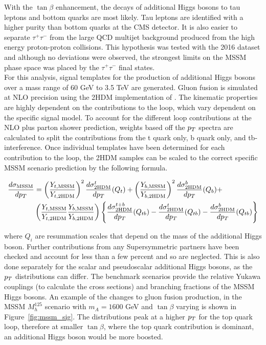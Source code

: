With the $\tan\beta$ enhancement, the decays of additional Higgs bosons to tau leptons and bottom quarks are most likely.
Tau leptons are identified with a higher purity than bottom quarks at the CMS detector.
It is also easier to separate $\tau^{+}\tau^{-}$ from the large QCD multijet background produced from the high energy proton-proton collisions.
This hypothesis was tested with the 2016 dataset and although no deviations were observed, the strongest limits on the MSSM phase space was placed by the $\tau^+\tau^-$ final states. \\

For this analysis, signal templates for the production of additional Higgs bosons over a mass range of 60 GeV to 3.5 TeV are generated.
Gluon fusion is simulated at NLO precision using the 2HDM implementation of .
The kinematic properties are highly dependent on the contributions to the loop, which vary dependent on the specific signal model.
To account for the different loop contributions at the NLO plus parton shower prediction, weights based off the $p_{T}$ spectra are calculated to split the contributions from the t quark only, b quark only, and tb-interference.
Once individual templates have been determined for each contribution to the loop, the 2HDM samples can be scaled to the correct specific MSSM scenario prediction by the following formula.

\begin{align}
\frac{d\sigma_{\text{MSSM}}}{dp_{T}} & = \left(\frac{Y_{t,\text{MSSM}}}{Y_{t,\text{2HDM}}}\right)^{2}\frac{d\sigma^{t}_{\text{2HDM}}}{dp_{T}}(Q_{t}) + \left(\frac{Y_{b,\text{MSSM}}}{Y_{b,\text{2HDM}}}\right)^{2}\frac{d\sigma^{b}_{\text{2HDM}}}{dp_{T}}(Q_{b}) + \nonumber \\
& \left(\frac{Y_{t,\text{MSSM}}}{Y_{t,\text{2HDM}}}\frac{Y_{b,\text{MSSM}}}{Y_{b,\text{2HDM}}}\right) \left\{ \frac{d\sigma^{t+b}_{\text{2HDM}}}{dp_{T}}(Q_{tb}) - \frac{d\sigma^{t}_{\text{2HDM}}}{dp_{T}}(Q_{tb}) - \frac{d\sigma^{b}_{\text{2HDM}}}{dp_{T}}(Q_{tb}) \right\} 
\label{eqn:mssm_xs}
\end{align}

where $Q_i$ are resummation scales that depend on the mass of the additional Higgs boson.
Further contributions from any Supersymmetric partners have been checked and account for less than a few percent and so are neglected.
This is also done separately for the scalar and pseudoscalar additional Higgs bosons, as the $p_{T}$ distributions can differ.
The benchmark scenarios provide the relative Yukawa couplings (to calculate the cross sections) and branching fractions of the MSSM Higgs bosons.
An example of the changes to gluon fusion production, in the MSSM $M_{h}^{125}$ scenario with $m_{A} = 1600$ GeV and $\tan\beta$ varying is shown in Figure~\ref{fig:mssm_sig}.
The distributions peak at a higher $p_{T}$ for the top quark loop, therefore at smaller $\tan\beta$, where the top quark contribution is dominant, an additional Higgs boson would be more boosted. \\

